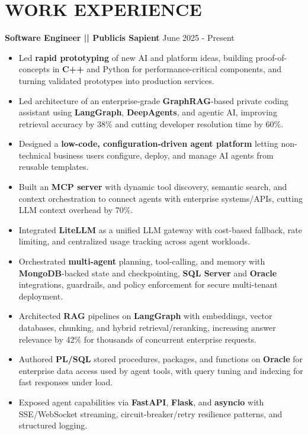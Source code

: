 \documentclass[a4paper]{article}
\begin{document}
\section*{WORK EXPERIENCE}
\textbf{Software Engineer || Publicis Sapient}
\hfill June 2025 - Present
\begin{itemize}
\vspace{1pt}
\item {Led \textbf{rapid prototyping} of new AI and platform ideas, building proof-of-concepts in \textbf{C++} and Python for performance-critical components, and turning validated prototypes into production services.}
\item {Led architecture of an enterprise-grade \textbf{GraphRAG}-based private coding assistant using \textbf{LangGraph}, \textbf{DeepAgents}, and agentic AI, improving retrieval accuracy by 38\% and cutting developer resolution time by 60\%.}
\item {Designed a \textbf{low-code, configuration-driven agent platform} letting non-technical business users configure, deploy, and manage AI agents from reusable templates.}
\item {Built an \textbf{MCP server} with dynamic tool discovery, semantic search, and context orchestration to connect agents with enterprise systems/APIs, cutting LLM context overhead by 70\%.}
\item {Integrated \textbf{LiteLLM} as a unified LLM gateway with cost-based fallback, rate limiting, and centralized usage tracking across agent workloads.}
\item {Orchestrated \textbf{multi-agent} planning, tool-calling, and memory with \textbf{MongoDB}-backed state and checkpointing, \textbf{SQL Server} and \textbf{Oracle} integrations, guardrails, and policy enforcement for secure multi-tenant deployment.}
\item {Architected \textbf{RAG} pipelines on \textbf{LangGraph} with embeddings, vector databases, chunking, and hybrid retrieval/reranking, increasing answer relevance by 42\% for thousands of concurrent enterprise requests.}
\item {Authored \textbf{PL/SQL} stored procedures, packages, and functions on \textbf{Oracle} for enterprise data access used by agent tools, with query tuning and indexing for fast responses under load.}
\item {Exposed agent capabilities via \textbf{FastAPI}, \textbf{Flask}, and \textbf{asyncio} with SSE/WebSocket streaming, circuit-breaker/retry resilience patterns, and structured logging.}

\end{itemize}
\end{document}
